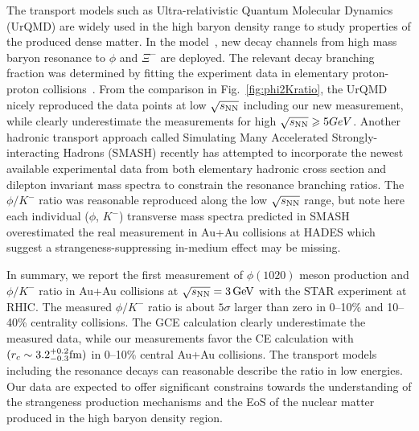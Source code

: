\documentclass[%
 reprint,	
showpacs,
 amsmath,amssymb,
 aps,
 prc,
]{revtex4-1}
\begin{document}
The transport models such as Ultra-relativistic Quantum Molecular Dynamics (UrQMD) are widely used in the high baryon density range to study properties of the produced dense matter. In the model~\cite{Steinheimer_2015}, new decay channels from high mass baryon resonance to $\phi$ and $\Xi^-$ are deployed. The relevant decay branching fraction was determined by fitting the experiment data in elementary proton-proton collisions~\cite{PhysRevC.77.015204}. From the comparison in Fig.~\ref{fig:phi2Kratio}, the UrQMD nicely reproduced the data points at low ${\sqrt{s_{\rm NN}}}$ including our new measurement, while clearly underestimate the measurements for high $\sqrt{s_{\rm NN}}\geqslant 5 GeV$. Another hadronic transport approach called Simulating Many Accelerated Strongly-interacting Hadrons (SMASH) recently has attempted to incorporate the newest available experimental data from both elementary hadronic cross section and dilepton invariant mass spectra to constrain the resonance branching ratios. The $\phi/K^-$ ratio was reasonable reproduced along the low ${\sqrt{s_{\rm NN}}}$ range, but note here each individual ($\phi$, $K^-$) transverse mass spectra predicted in SMASH overestimated the real measurement in Au+Au collisions at HADES which suggest a strangeness-suppressing in-medium effect may be missing.

In summary, we report the first measurement of $\phi(1020)$ meson production and $\phi/K^-$ ratio in Au+Au collisions at ${\sqrt{s_{\rm NN}} = \rm{3\,GeV}}$ with the STAR experiment at RHIC. The measured $\phi/K^-$ ratio is about $5\sigma$ larger than zero in 0--10\% and 10--40\% centrality collisions. The GCE calculation clearly underestimate the measured data, while our measurements favor the CE calculation with $(r_c \sim 3.2_{-0.3}^{+0.2} \rm{fm})$ in 0--10\% central Au+Au collisions. The transport models including the resonance decays can reasonable describe the ratio in low energies. Our data are expected to offer significant constrains towards the understanding of the strangeness production mechanisms and the EoS of the nuclear matter produced in the high baryon density region.



\end{document}
